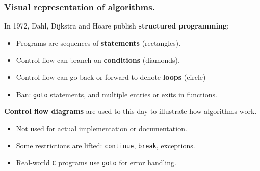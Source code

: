\documentclass{beamer} %
\newcommand\emc[1]{\textcolor{brightblue}{\textbf{#1}}}
\begin{document}
\begin{frame}

\frametitle{Visual representation of algorithms.}

In 1972, Dahl, Dijkstra and Hoare publish \emc{structured programming}:
\begin{itemize}
  \item Programs are sequences of \emc{statements} (rectangles).
  \item Control flow can branch on \emc{conditions} (diamonds).
  \item Control flow can go back or forward to denote \emc{loops} (circle)
  \item Ban: \texttt{goto} statements, and multiple entries or exits in functions.
\end{itemize}

\vspace{3mm}
\emc{Control flow diagrams} are used to this day to illustrate how algorithms work.
\begin{itemize}
  \item Not used for actual implementation or documentation.
  \item Some restrictions are lifted: \texttt{continue}, \texttt{break}, exceptions.
  \item Real-world \texttt{C} programs use \texttt{goto} for error handling.
\end{itemize}

\end{frame}
\end{document}
